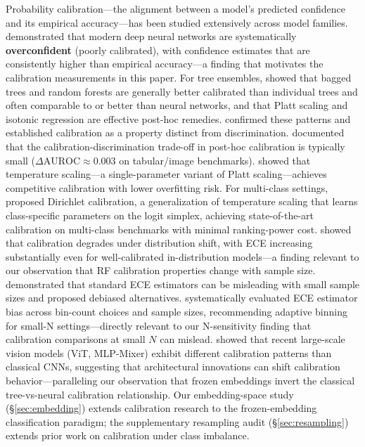 \documentclass[11pt]{article}
\begin{document}
Probability calibration---the alignment between a model's predicted confidence and its empirical accuracy---has been studied extensively across model families. \citet{guo2017calibration} demonstrated that modern deep neural networks are systematically \textbf{overconfident} (poorly calibrated), with confidence estimates that are consistently higher than empirical accuracy---a finding that motivates the calibration measurements in this paper. For tree ensembles, \citet{niculescu2005predicting} showed that bagged trees and random forests are generally better calibrated than individual trees and often comparable to or better than neural networks, and that Platt scaling and isotonic regression are effective post-hoc remedies. \citet{bostrom2008calibration} confirmed these patterns and established calibration as a property distinct from discrimination. \citet{wang2021revisiting} documented that the calibration-discrimination trade-off in post-hoc calibration is typically small ($\Delta\text{AUROC} \approx 0.003$ on tabular/image benchmarks). \citet{kull2017temperature} showed that temperature scaling---a single-parameter variant of Platt scaling---achieves competitive calibration with lower overfitting risk. For multi-class settings, \citet{kull2019dirichlet} proposed Dirichlet calibration, a generalization of temperature scaling that learns class-specific parameters on the logit simplex, achieving state-of-the-art calibration on multi-class benchmarks with minimal ranking-power cost. \citet{ovadia2019uncertainty} showed that calibration degrades under distribution shift, with ECE increasing substantially even for well-calibrated in-distribution models---a finding relevant to our observation that RF calibration properties change with sample size. \citet{roelofs2022mitigating} demonstrated that standard ECE estimators can be misleading with small sample sizes and proposed debiased alternatives. \citet{nixon2019measuring} systematically evaluated ECE estimator bias across bin-count choices and sample sizes, recommending adaptive binning for small-N settings---directly relevant to our N-sensitivity finding that calibration comparisons at small $N$ can mislead. \citet{minderer2021revisiting} showed that recent large-scale vision models (ViT, MLP-Mixer) exhibit different calibration patterns than classical CNNs, suggesting that architectural innovations can shift calibration behavior---paralleling our observation that frozen embeddings invert the classical tree-vs-neural calibration relationship. Our embedding-space study (§\ref{sec:embedding}) extends calibration research to the frozen-embedding classification paradigm; the supplementary resampling audit (§\ref{sec:resampling}) extends prior work on calibration under class imbalance.
\end{document}
